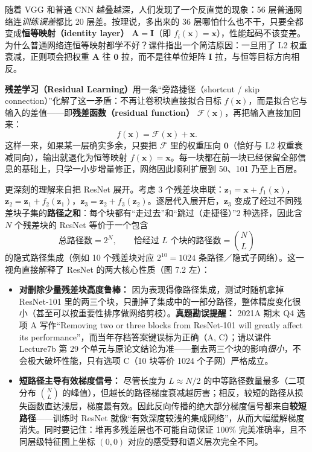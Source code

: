 随着 VGG 和普通 CNN 越叠越深，人们发现了一个反直觉的现象：56 层普通网络连\emph{训练误差}都比 20 层差。按理说，多出来的 36 层哪怕什么也不干，只要全都变成\textbf{恒等映射（identity layer）} $\mathbf{A}=\mathbf{I}$（即 $f_i(\mathbf{x})=\mathbf{x}$），性能起码不该变差。为什么普通网络连恒等映射都学不好？课件指出一个简洁原因：一旦用了 L2 权重衰减，正则项会把权重 $\mathbf{A}$ 往 $\mathbf{0}$ 拉，而不是往单位矩阵 $\mathbf{I}$ 拉，与恒等目标方向相反。

\textbf{残差学习（Residual Learning）}用一条“旁路捷径（shortcut / skip connection）”化解了这一矛盾：不再让卷积块直接拟合目标 $f(\mathbf{x})$，而是拟合它与输入的差值——即\textbf{残差函数（residual function）} $\mathcal{F}(\mathbf{x})$，再把输入直接加回来：
\[
f(\mathbf{x}) = \mathcal{F}(\mathbf{x}) + \mathbf{x}.
\tag{7.8}
\]
这样一来，如果某一层确实多余，只要把 $\mathcal{F}$ 里的权重压向 $\mathbf{0}$（恰好与 L2 权重衰减同向），输出就退化为恒等映射 $f(\mathbf{x})=\mathbf{x}$。每一块都在前一块已经保留全部信息的基础上，只学一小步增量修正，网络因此顺利扩展到 50、101 乃至上百层。

更深刻的理解来自把 ResNet 展开。考虑 3 个残差块串联：$\mathbf{z}_1 = \mathbf{x} + f_1(\mathbf{x})$，$\mathbf{z}_2 = \mathbf{z}_1 + f_2(\mathbf{z}_1)$，$\mathbf{z}_3 = \mathbf{z}_2 + f_3(\mathbf{z}_2)$。逐层代入展开后，$\mathbf{z}_3$ 变成了经过不同残差块子集的\textbf{路径之和}：每个块都有“走过去”和“跳过（走捷径）”2 种选择，因此含 $N$ 个残差块的 ResNet 等价于一个包含
\[
\text{总路径数} = 2^N, \qquad \text{恰经过 } L \text{ 个块的路径数} = \binom{N}{L}
\tag{7.9}
\]
的隐式路径集成（例如 10 个残差块对应 $2^{10}=1024$ 条路径／隐式子网络）。这一视角直接解释了 ResNet 的两大核心性质（图 7.2 左）：
\begin{itemize}
\item \textbf{对删除少量残差块高度鲁棒：} 因为表现得像路径集成，测试时随机拿掉 ResNet-101 里的两三个块，只删掉了集成中的一部分路径，整体精度变化很小（甚至可以按重要性排序做网络剪枝）。\textbf{真题勘误提醒：} 2021A 期末 Q4 选项 A 写作“Removing two or three blocks from ResNet-101 will greatly affect its performance”，而当年存档答案键误标为正确（A, C）；请以课件 Lecture7b 第 29 个单元与原论文结论为准——删去两三个块的影响\emph{很小}，不会极大破坏性能，只有选项 C（10 块等价 1024 个子网）严格成立。
\item \textbf{短路径主导有效梯度信号：} 尽管长度为 $L\approx N/2$ 的中等路径数量最多（二项分布 $\binom{N}{L}$ 的峰值），但越长的路径梯度衰减越厉害；相反，较短的路径从损失函数直达浅层，梯度最有效。因此反向传播的绝大部分梯度信号都来自\textbf{较短路径}——训练时 ResNet 就像“有效深度较浅的集成网络”，从而大幅缓解梯度消失。同时要记住：堆再多残差层也不可能自动保证 100\% 完美准确率，且不同层级特征图上坐标 $(0,0)$ 对应的感受野和语义层次完全不同。
\end{itemize}

